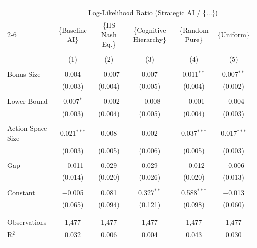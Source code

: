 \begin{tabular}{@{\extracolsep{5pt}}lccccc} 
\\[-1.8ex]\hline 
\hline \\[-1.8ex] 
 & \multicolumn{5}{c}{Log-Likelihood Ratio (Strategic AI / \{...\})} \\ 
\cline{2-6} 
 & \{Baseline AI\} & \{HS Nash Eq.\} & \{Cognitive Hierarchy\} & \{Random Pure\} & \{Uniform\} \\ 
\\[-1.8ex] & (1) & (2) & (3) & (4) & (5)\\ 
\hline \\[-1.8ex] 
 Bonus Size & 0.004 & $-$0.007 & 0.007 & 0.011$^{**}$ & 0.007$^{**}$ \\ 
  & (0.003) & (0.004) & (0.005) & (0.004) & (0.002) \\ 
  & & & & & \\ 
 Lower Bound & 0.007$^{*}$ & $-$0.002 & $-$0.008 & $-$0.001 & $-$0.004 \\ 
  & (0.003) & (0.004) & (0.005) & (0.004) & (0.003) \\ 
  & & & & & \\ 
 Action Space Size & 0.021$^{***}$ & 0.008 & 0.002 & 0.037$^{***}$ & 0.017$^{***}$ \\ 
  & (0.003) & (0.005) & (0.006) & (0.005) & (0.003) \\ 
  & & & & & \\ 
 Gap & $-$0.011 & 0.029 & 0.029 & $-$0.012 & $-$0.006 \\ 
  & (0.014) & (0.020) & (0.026) & (0.020) & (0.013) \\ 
  & & & & & \\ 
 Constant & $-$0.005 & 0.081 & 0.327$^{**}$ & 0.588$^{***}$ & $-$0.013 \\ 
  & (0.065) & (0.094) & (0.121) & (0.098) & (0.060) \\ 
  & & & & & \\ 
\hline \\[-1.8ex] 
Observations & 1,477 & 1,477 & 1,477 & 1,477 & 1,477 \\ 
R$^{2}$ & 0.032 & 0.006 & 0.004 & 0.043 & 0.030 \\ 
\hline 
\hline \\[-1.8ex] 
\end{tabular}
